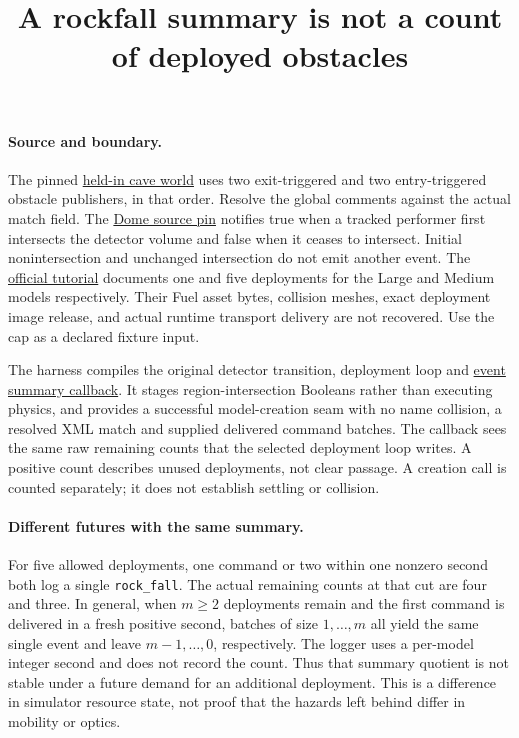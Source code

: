 \documentclass[11pt]{article}
\title{A rockfall summary is not a count of deployed obstacles}
\author{}\date{}
\begin{document}
\maketitle

\paragraph{Source and boundary.}
The pinned \href{https://github.com/osrf/subt/blob/083c6a8acb0c25aa1a35e34517e628cd3b52ae77/subt_ign/worlds/cave_circuit/01/cave_circuit_01.sdf}
{held-in cave world} uses two exit-triggered and two entry-triggered
obstacle publishers, in that order. Resolve the global comments against
the actual match field. The
\href{https://github.com/gazebosim/gz-sim/tree/2a076e91c6df7699284ab93e244894bb0f55336f/src/systems}{Dome source pin}
notifies true when a tracked performer first intersects the detector
volume and false when it ceases to intersect. Initial nonintersection
and unchanged intersection do not emit another event.
The \href{https://github.com/osrf/subt/wiki/RockFalls-tutorial#dynamic-rock-placement}
{official tutorial} documents one and five deployments for the Large
and Medium models respectively. Their Fuel asset bytes, collision meshes,
exact deployment image release, and actual runtime transport delivery
are not recovered. Use the cap as a declared fixture input.

The harness compiles the original detector transition, deployment loop
and \href{https://github.com/osrf/subt/blob/083c6a8acb0c25aa1a35e34517e628cd3b52ae77/subt_ign/src/GameLogicPlugin.cc}
{event summary callback}. It stages region-intersection Booleans rather
than executing physics, and provides a successful model-creation seam
with no name collision, a resolved XML match and supplied delivered
command batches. The callback sees the same raw remaining counts that
the selected deployment loop writes. A positive count describes unused
deployments, not clear passage. A creation call is counted separately;
it does not establish settling or collision.

\paragraph{Different futures with the same summary.}
For five allowed deployments, one command or two within one nonzero
second both log a single \texttt{rock\_fall}. The actual remaining
counts at that cut are four and three. In general, when \(m\ge2\)
deployments remain and the first command is delivered in a fresh
positive second, batches of size \(1,\ldots,m\) all yield the same
single event and leave \(m-1,\ldots,0\), respectively. The logger uses a
per-model integer second and does not record the count.
Thus that summary quotient is not stable under a future demand for an
additional deployment. This is a difference in simulator resource state,
not proof that the hazards left behind differ in mobility or optics.
\end{document}
